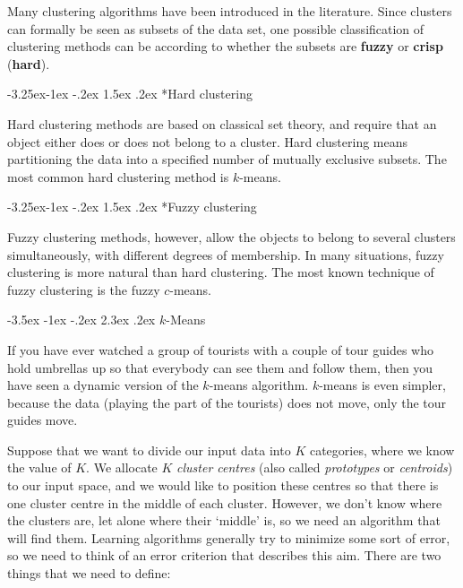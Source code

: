 \documentclass[]{book}
\makeatletter
\renewcommand\section{\@startsection {section}{1}{\z@}%
                                   {-3.5ex \@plus -1ex \@minus -.2ex}%
                                   {2.3ex \@plus.2ex}%
                                   {\normalfont\Large\bfseries\color{ForestGreen}}}
\renewcommand\subsection{\@startsection{subsection}{2}{\z@}%
                                     {-3.25ex\@plus -1ex \@minus -.2ex}%
                                     {1.5ex \@plus .2ex}%
                                     {\normalfont\large\bfseries\color{Violet}}}
\theoremstyle{definition}
\theoremstyle{definition}
\theoremstyle{definition}
\theoremstyle{remark}
\makeatother
\begin{document}
Many clustering algorithms have been introduced in the literature. Since
clusters can formally be seen as subsets of the data set, one possible
classification of clustering methods can be according to whether the
subsets are \textbf{fuzzy} or \textbf{crisp} (\textbf{hard}).

\subsection*{Hard clustering}\label{hard-clustering}

Hard clustering methods are based on classical set theory, and require
that an object either does or does not belong to a cluster. Hard
clustering means partitioning the data into a specified number of
mutually exclusive subsets. The most common hard clustering method is
\(k\)-means.

\subsection*{Fuzzy clustering}\label{fuzzy-clustering}

Fuzzy clustering methods, however, allow the objects to belong to
several clusters simultaneously, with different degrees of membership.
In many situations, fuzzy clustering is more natural than hard
clustering. The most known technique of fuzzy clustering is the fuzzy
\(c\)-means.

\section{\texorpdfstring{\(k\)-Means}{k-Means}}\label{k-means}

If you have ever watched a group of tourists with a couple of tour
guides who hold umbrellas up so that everybody can see them and follow
them, then you have seen a dynamic version of the \(k\)-means algorithm.
\(k\)-means is even simpler, because the data (playing the part of the
tourists) does not move, only the tour guides move.

Suppose that we want to divide our input data into \(K\) categories,
where we know the value of \(K\). We allocate \(K\) \emph{cluster
centres} (also called \emph{prototypes} or \emph{centroids}) to our
input space, and we would like to position these centres so that there
is one cluster centre in the middle of each cluster. However, we don't
know where the clusters are, let alone where their `middle' is, so we
need an algorithm that will find them. Learning algorithms generally try
to minimize some sort of error, so we need to think of an error
criterion that describes this aim. There are two things that we need to
define:
\end{document}

